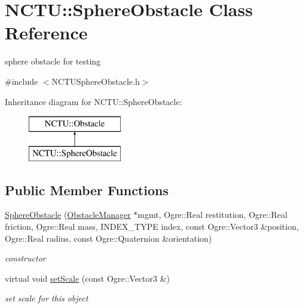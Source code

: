 \hypertarget{class_n_c_t_u_1_1_sphere_obstacle}{}\section{N\+C\+TU\+:\+:Sphere\+Obstacle Class Reference}
\label{class_n_c_t_u_1_1_sphere_obstacle}


sphere obstacle for testing  




{\ttfamily \#include $<$N\+C\+T\+U\+Sphere\+Obstacle.\+h$>$}

Inheritance diagram for N\+C\+TU\+:\+:Sphere\+Obstacle\+:\begin{figure}[H]
\begin{center}
\leavevmode
\includegraphics[height=2.000000cm]{class_n_c_t_u_1_1_sphere_obstacle}
\end{center}
\end{figure}
\subsection*{Public Member Functions}
\begin{DoxyCompactItemize}
\item 
\hyperlink{class_n_c_t_u_1_1_sphere_obstacle_aab3b59f8a8426743205288bc3f577462}{Sphere\+Obstacle} (\hyperlink{class_n_c_t_u_1_1_obstacle_manager}{Obstacle\+Manager} $\ast$mgmt, Ogre\+::\+Real restitution, Ogre\+::\+Real friction, Ogre\+::\+Real mass, I\+N\+D\+E\+X\+\_\+\+T\+Y\+PE index, const Ogre\+::\+Vector3 \&position, Ogre\+::\+Real radius, const Ogre\+::\+Quaternion \&orientation)
\begin{DoxyCompactList}\small\item\em constructor \end{DoxyCompactList}\item 
virtual void \hyperlink{class_n_c_t_u_1_1_sphere_obstacle_afb4c3cd47a6482abc858c64078658163}{set\+Scale} (const Ogre\+::\+Vector3 \&)\hypertarget{class_n_c_t_u_1_1_sphere_obstacle_afb4c3cd47a6482abc858c64078658163}{}\label{class_n_c_t_u_1_1_sphere_obstacle_afb4c3cd47a6482abc858c64078658163}

\begin{DoxyCompactList}\small\item\em set scale for this object \end{DoxyCompactList}\end{DoxyCompactItemize}
